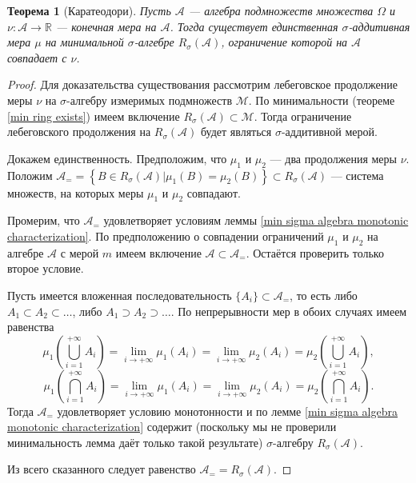 \documentclass[12pt]{article}
\newtheorem{theorem}{Теорема}
\numberwithin{theorem}{section}
\theoremstyle{definition}
\newcommand{\RR}{\mathbb{R}}
\newcommand{\calA}{\mathcal{A}}
\newcommand{\calM}{\mathcal{M}}
\newcommand{\defineset}[2]{\left\{
	\left.
	#1
	\right\vert
	#2
	\right\}}
\begin{document}
	\begin{theorem}[Каратеодори] \label{uniqueness of extention to the minimal sigma algebra}
		Пусть $ \calA $ --- алгебра подмножеств множества $ \Omega $
		и $ \nu \colon \calA \to \RR $ --- конечная мера на $ \calA $.
		Тогда существует единственная $ \sigma $-аддитивная мера $ \mu $ 
		на минимальной $ \sigma $-алгебре $ R_{\sigma}(\calA) $,
		ограничение которой на $ \calA $ совпадает с $ \nu $.
	\end{theorem}
	
	\begin{proof}
		Для доказательства существования рассмотрим лебеговское продолжение меры $ \nu $ на $ \sigma $-алгебру измеримых подмножеств $ \calM $.
		По минимальности (теореме \ref{min ring exists}) имеем включение $ R_{\sigma}(\calA) \subset \calM $.
		Тогда ограничение лебеговского продолжения на $ R_{\sigma}(\calA) $ будет являться $ \sigma $-аддитивной мерой.
		
		Докажем единственность. Предположим, что $ \mu_1 $ и $ \mu_2 $ --- два продолжения меры $ \nu $.
		Положим $ \calA_{=} = \defineset{B \in R_{\sigma}(\calA)}{\mu_1(B) = \mu_2(B)} \subset R_{\sigma}(\calA) $ 
		--- система множеств, на которых меры $ \mu_1 $ и $ \mu_2 $ совпадают.
	
		Промерим, что $ \calA_{=} $ удовлетворяет условиям леммы \ref{min sigma algebra monotonic characterization}.
		По предположению о совпадении ограничений $ \mu_1 $ и $ \mu_2 $ на алгебре $ \calA $ с мерой $ m $ 
		имеем включение $ \calA \subset \calA_{=} $.
		Остаётся проверить только второе условие.
		
		Пусть имеется вложенная последовательность $ \{A_i\} \subset \calA_{=} $,
		то есть либо $ A_1 \subset A_2 \subset \ldots $, либо $ A_1 \supset A_2 \supset \ldots $.
		По непрерывности мер в обоих случаях имеем равенства
		$$ \mu_1\left(\bigcup\limits_{i = 1}^{+\infty} A_i\right)
		= \lim\limits_{i \to +\infty} \mu_1(A_i) 
		= \lim\limits_{i \to +\infty} \mu_2(A_i)
		= \mu_2\left(\bigcup\limits_{i = 1}^{+\infty} A_i\right), $$
		$$ \mu_1\left(\bigcap\limits_{i = 1}^{+\infty} A_i\right)
		= \lim\limits_{i \to +\infty} \mu_1(A_i) 
		= \lim\limits_{i \to +\infty} \mu_2(A_i)
		= \mu_2\left(\bigcap\limits_{i = 1}^{+\infty} A_i\right). $$
		Тогда $ \calA_{=} $ удовлетворяет условию монотонности и по лемме \ref{min sigma algebra monotonic characterization} содержит (поскольку мы не проверили минимальность лемма даёт только такой результате) 
		$ \sigma $-алгебру $ R_{\sigma}(\calA) $.
		
		Из всего сказанного следует равенство $ \calA_{=} = R_{\sigma}(\calA) $.
	\end{proof}
	
\end{document}
